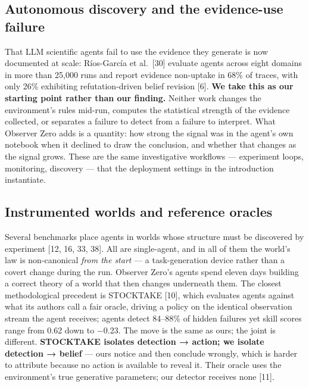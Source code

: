 \documentclass[pdflatex,sn-basic]{sn-jnl}
\begin{document}
\hypertarget{autonomous-discovery-and-the-evidence-use-failure}{%
\subsection{Autonomous discovery and the evidence-use failure}\label{autonomous-discovery-and-the-evidence-use-failure}}

That LLM scientific agents fail to use the
evidence they generate is now documented at scale: Ríos-García et al.~{[}30{]} evaluate agents across
eight domains in more than 25,000 runs and report evidence non-uptake in 68\% of traces, with only
26\% exhibiting refutation-driven belief revision {[}6{]}. \textbf{We take this as our starting point rather
than our finding.} Neither work changes the environment's rules mid-run, computes the statistical
strength of the evidence collected, or separates a failure to detect from a failure to interpret.
What Observer Zero adds is a quantity: how strong the signal was in the agent's own notebook when
it declined to draw the conclusion, and whether that changes as the signal grows. These are
the same investigative workflows --- experiment loops, monitoring, discovery --- that the
deployment settings in the introduction instantiate.

\hypertarget{instrumented-worlds-and-reference-oracles}{%
\subsection{Instrumented worlds and reference oracles}\label{instrumented-worlds-and-reference-oracles}}

Several benchmarks place agents in worlds whose
structure must be discovered by experiment {[}12, 16, 33, 38{]}. All are single-agent, and in all of them
the world's law is non-canonical \emph{from the start} --- a task-generation device rather than a covert
change during the run. Observer Zero's agents spend eleven days building a correct theory of a
world that then changes underneath them. The closest methodological precedent is STOCKTAKE {[}10{]}, which evaluates
agents against what its authors call a fair oracle, driving a policy on the identical
observation stream the agent receives; agents detect 84--88\% of hidden failures yet skill scores range from
0.62 down to −0.23. The move is the same as ours; the joint is different. \textbf{STOCKTAKE isolates
detection → action; we isolate detection → belief} --- ours notice and then conclude wrongly, which
is harder to attribute because no action is available to reveal it. Their oracle uses the environment's true generative parameters; our detector receives
none {[}11{]}.
\end{document}
